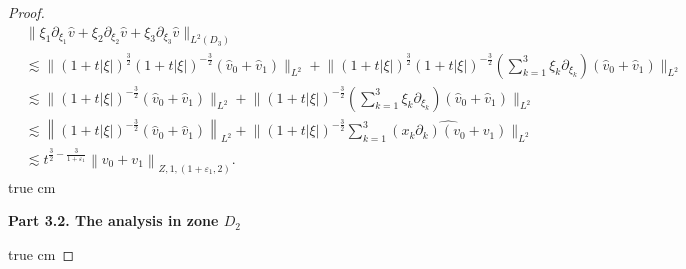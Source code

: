 \documentclass[10pt,a4paper]{amsart}
\newcommand{\f}{\frac}
\newcommand{\p}{\partial}
\begin{document}
\begin{proof}
\begin{equation}
\begin{aligned}
&\big\|\xi_1\p_{\xi_1}\hat{v}+\xi_2\p_{\xi_2}\hat{v}+\xi_3\p_{\xi_3}\hat{v}\big\|_{L^2(D_3)}\\
&\lesssim \big\|(1+t|\xi|)^{\f32}(1+t|\xi|)^{-\f32}(\hat{v}_{0}+\hat{v}_{1})\big\|_{L^{2}}+ \big\|(1+t|\xi|)^{\f32}(1+t|\xi|)^{-\f32}(\sum_{k=1}^3\xi_k\p_{\xi_k})(\hat{v}_{0}+\hat{v}_{1})\big\|_{L^{2}}\\
&\lesssim \big\|(1+t|\xi|)^{-\f32}(\hat{v}_{0}+\hat{v}_{1})\big\|_{L^{2}}+ \big\|(1+t|\xi|)^{-\f32}(\sum_{k=1}^3\xi_k\p_{\xi_k})(\hat{v}_{0}+\hat{v}_{1})\big\|_{L^{2}}\\
& \lesssim \left\|(1+t|\xi|)^{-\f{3}{2}}(\hat{v}_{0}+\hat{v}_{1})\right\|_{L^{2}}+
\big\|(1+t|\xi|)^{-\f{3}{2}}\sum_{k=1}^3\widehat{(x_k\p_k)(v_0+v_1)}\big\|_{L^{2}}\\
&\lesssim  t^{\f32-\f{3}{1+\varepsilon_1}}\left\|v_0+v_1\right\|_{Z, 1,(1+\varepsilon_1, 2)}.
\end{aligned}
\end{equation}
 true cm

{\bf Part 3.2.  The analysis  in zone $D_2$}

 true cm


\end{proof}
\end{document}
